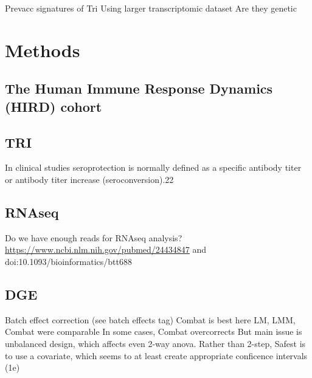 Prevacc signatures of Tri
Using larger transcriptomic dataset
Are they genetic

\section{Methods}

\subsection{The Human Immune Response Dynamics (HIRD) cohort}

\subsection{TRI}

In clinical studies seroprotection is normally defined as a specific antibody titer or antibody titer increase (seroconversion).22

\subsection{RNAseq}

Do we have enough reads for RNAseq analysis? \url{https://www.ncbi.nlm.nih.gov/pubmed/24434847} and doi:10.1093/bioinformatics/btt688

\subsection{DGE}

Batch effect correction (see batch effects tag)
Combat is best here
LM, LMM, Combat were comparable
In some cases, Combat overcorrects
But main issue is unbalanced design, which affects even 2-way anova. Rather than 2-step, Safest is to use a covariate, which seems to at least create appropriate conficence intervals (1e)


